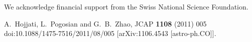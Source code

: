 \documentclass[a4paper,10pt]{article}
\begin{document}
We acknowledge financial support from the Swiss National Science Foundation.


\appendix
%

%



\begin{thebibliography}{999}
\newcommand{\bb}{\bibitem}
  A.~Hojjati, L.~Pogosian and G.~B.~Zhao,
  JCAP {\bf 1108} (2011) 005
  doi:10.1088/1475-7516/2011/08/005
  [arXiv:1106.4543 [astro-ph.CO]].
 \end{thebibliography}
\end{document}
